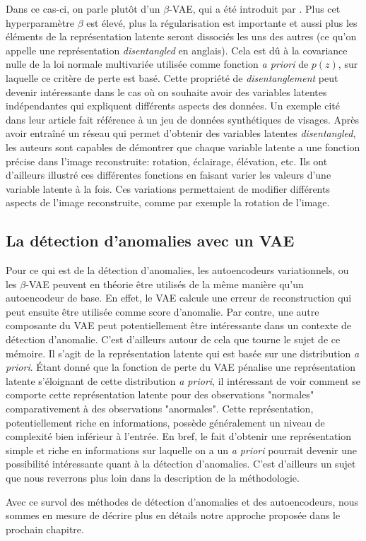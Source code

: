 Dans ce cas-ci, on parle plutôt d'un $\beta$-VAE, qui a été introduit par \cite{Higgins2017betaVAELB}. Plus cet hyperparamètre $\beta$ est élevé, plus la régularisation est importante et aussi plus les éléments de la représentation latente seront dissociés les uns des autres (ce qu'on appelle une représentation \textit{disentangled} en anglais). Cela est dû à la covariance nulle de la loi normale multivariée utilisée comme fonction \textit{a priori} de $p(z)$, sur laquelle ce critère de perte est basé. Cette propriété de \textit{disentanglement} peut devenir intéressante dans le cas où on souhaite avoir des variables latentes indépendantes qui expliquent différents aspects des données. Un exemple cité dans leur article fait référence à un jeu de données synthétiques de visages. Après avoir entraîné un réseau qui permet d'obtenir des variables latentes \textit{disentangled}, les auteurs sont capables de démontrer que chaque variable latente a une fonction précise dans l'image reconstruite: rotation, éclairage, élévation, etc. Ils ont d'ailleurs illustré ces différentes fonctions en faisant varier les valeurs d'une variable latente à la fois. Ces variations permettaient de modifier différents aspects de l'image reconstruite, comme par exemple la rotation de l'image.

\subsection{La détection d'anomalies avec un VAE}

Pour ce qui est de la détection d'anomalies, les autoencodeurs variationnels, ou les $\beta$-VAE peuvent en théorie être utilisés de la même manière qu'un autoencodeur de base. En effet, le VAE calcule une erreur de reconstruction qui peut ensuite être utilisée comme score d'anomalie. Par contre, une autre composante du VAE peut potentiellement être intéressante dans un contexte de détection d'anomalie. C'est d'ailleurs autour de cela que tourne le sujet de ce mémoire. Il s'agit de la représentation latente qui est basée sur une distribution \textit{a priori}. Étant donné que la fonction de perte du VAE pénalise une représentation latente s'éloignant de cette distribution \textit{a priori}, il intéressant de voir comment se comporte cette représentation latente pour des observations "normales" comparativement à des observations "anormales". Cette représentation, potentiellement riche en informations, possède généralement un niveau de complexité bien inférieur à l'entrée. En bref, le fait d'obtenir une représentation simple et riche en informations sur laquelle on a un \textit{a priori} pourrait devenir une possibilité intéressante quant à la détection d'anomalies. C'est d'ailleurs un sujet que nous reverrons plus loin dans la description de la méthodologie.

Avec ce survol des méthodes de détection d'anomalies et des autoencodeurs, nous sommes en mesure de décrire plus en détails notre approche proposée dans le prochain chapitre.
